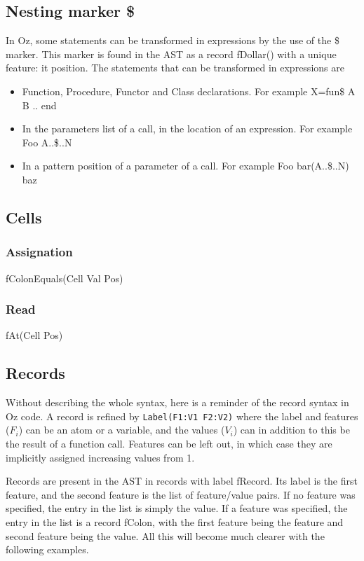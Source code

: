 \documentclass[a4paper]{memoir}
\begin{document}
\subsection{Nesting marker \$}
In Oz, some statements can be transformed in expressions by the use of the \$ marker. This marker is found in the AST as a record fDollar() with a unique feature: it position.
The statements that can be transformed in expressions are
\begin{itemize}
  \item Function, Procedure, Functor and Class declarations. For example X=fun{\$ A B} .. end
  \item In the parameters list of a call, in the location of an expression. For example {Foo A..\$..N}
  \item In a pattern position of a parameter of a call. For example {Foo bar(A..\$..N) baz}
\end{itemize}

\subsection{Cells}
\subsubsection{Assignation}
fColonEquals(Cell Val Pos) %
\subsubsection{Read}
fAt(Cell Pos) %
\subsection{Records}
Without describing the whole syntax, here is a reminder of the record syntax in Oz code. A record is refined by \lstinline!Label(F1:V1 F2:V2)! where the label and features ($F_i$) can be an atom or a variable, and the values ($V_i$) can in addition to this be the result of a function call. Features can be left out, in which case they are implicitly assigned increasing values from 1.

Records are present in the AST in records with label fRecord. Its label is the first feature, and the second feature is the list of feature/value pairs. If no feature was specified, the entry in the list is simply the value. If a feature was specified, the entry in the list is a record fColon, with the first feature being the feature and second feature being the value. All this will become much clearer with the following examples.
\end{document}
